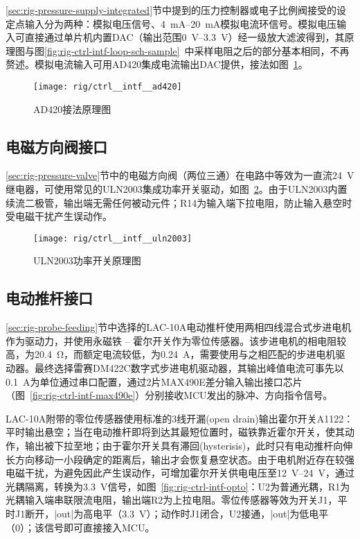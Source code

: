 \ref{sec:rig-pressure-supply-integrated}节中提到的压力控制器或电子比例阀接受的设定点输入分为两种：模拟电压信号、\SIrange{4}{20}{\mA}模拟电流环信号。模拟电压输入可直接通过单片机内置DAC（输出范围\SIrange{0}{3.3}{\V}）经一级放大滤波得到，其原理图与图\ref{fig:rig-ctrl-intf-loop-sch-sample}~中采样电阻之后的部分基本相同，不再赘述。模拟电流输入可用AD420集成电流输出DAC提供，接法如图~\ref{fig:rig-ctrl-intf-ad420}。

\begin{figure}[tbhp]
\centering
\texttt{[image: rig/ctrl\_\_intf\_\_ad420]}
\caption{AD420接法原理图}
\label{fig:rig-ctrl-intf-ad420}
\end{figure}

\subsection{电磁方向阀接口}\label{sec:rig-ctrl-intf-relay}

\ref{sec:rig-pressure-valve}节中的电磁方向阀（两位三通）在电路中等效为一直流\SI{24}{\V}继电器，可使用常见的ULN2003集成功率开关驱动，如图~\ref{fig:rig-ctrl-intf-uln2003}。由于ULN2003内置续流二极管，输出端无需任何被动元件；R14为输入端下拉电阻，防止输入悬空时受电磁干扰产生误动作。

\begin{figure}[tbhp]
\centering
\texttt{[image: rig/ctrl\_\_intf\_\_uln2003]}
\caption{ULN2003功率开关原理图}
\label{fig:rig-ctrl-intf-uln2003}
\end{figure}

\subsection{电动推杆接口}\label{sec:rig-ctrl-intf-stepper}

\ref{sec:rig-probe-feeding}节中选择的LAC-10A电动推杆使用两相四线混合式步进电机作为驱动力，并使用永磁铁 -- 霍尔开关作为零位传感器。该步进电机的相电阻较高，为\SI{20.4}{\ohm}，而额定电流较低，为\SI{0.24}{\A}，需要使用与之相匹配的步进电机驱动器。最终选择雷赛DM422C数字式步进电机驱动器，其输出峰值电流可事先以\SI{0.1}{\A}为单位通过串口配置，通过2片MAX490E差分输入输出接口芯片（图~\ref{fig:rig-ctrl-intf-max490e}）分别接收MCU发出的脉冲、方向指令信号。

LAC-10A附带的零位传感器使用标准的3线开漏(open drain)输出霍尔开关A1122：平时输出悬空；当在电动推杆即将到达其最短位置时，磁铁靠近霍尔开关，使其动作，输出被下拉至地；由于霍尔开关具有滞回(hysterisis)，此时只有电动推杆向伸长方向移动一小段确定的距离后，输出才会恢复悬空状态。由于电机附近存在较强电磁干扰，为避免因此产生误动作，可增加霍尔开关供电电压至\SIrange{12}{24}{\V}\footnotemark{}，通过光耦隔离，转换为\SI{3.3}{\V}信号，如图~\ref{fig:rig-ctrl-intf-opto}：U2为普通光耦，R1为光耦输入端串联限流电阻，输出端R2为上拉电阻。零位传感器等效为开关J1，平时J1断开，\bverb|out|为高电平（\SI{3.3}{\V}）；动作时J1闭合，U2接通，\bverb|out|为低电平（0）；该信号即可直接接入MCU。

